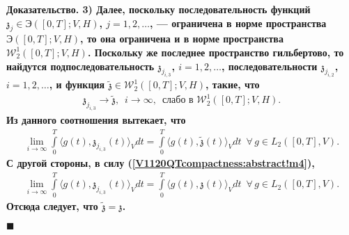 \documentclass{report}
\newenvironment{Proof}{\par\noindent\bf Доказательство.\rm}{ $\blacksquare$\par}
\begin{document}
\begin{Proof}
3) Далее, поскольку последовательность  функций $\mathfrak{z}_j\in \textrm{Э}([0,T];V,H)$, $j=1,2,\dots$, --- ограничена в норме пространства $\textrm{Э}([0,T];V,H)$, то она ограничена и в
норме пространства $\mathcal{W}^1_2([0,T];V,H)$. Поскольку же последнее пространство гильбертово, то найдутся подпоследовательность $\mathfrak{z}_{j_{i,3}}$, $i=1,2,\dots$,
последовательности $\mathfrak{z}_{j_{i,2}}$, $i=1,2,\dots$, и функция $\tilde{\mathfrak{z}}\in\mathcal{W}^1_2([0,T];V,H)$, такие, что
\begin{gather}\label{V1120QTcompactness:abstract!m7}
\mathfrak{z}_{j_{i,3}}\to\tilde{\mathfrak{z}},\,\,\,i\to\infty,\,\,\,\mbox{слабо в $\mathcal{W}^1_2([0,T];V,H)$}.
\end{gather}
Из данного соотношения вытекает, что
\begin{gather*}
\lim\limits_{i\to\infty}\int\limits_0^T\langle g(t),\mathfrak{z}_{j_{i,3}}(t)\rangle_Vdt=\int\limits_0^T\langle g(t),
\tilde{\mathfrak{z}}(t)\rangle_Vdt\,\,\,\forall\,g\in L_2([0,T],V).
\end{gather*}
С другой стороны, в силу (\ref{V1120QTcompactness:abstract!m4}),
\begin{gather*}
\lim\limits_{i\to\infty}\int\limits_0^T\langle g(t),\mathfrak{z}_{j_{i,3}}(t)\rangle_Vdt=\int\limits_0^T\langle g(t),\mathfrak{z}(t)\rangle_Vdt\,\,\,\forall\,g\in L_2([0,T],V).
\end{gather*}
Отсюда следует, что $\tilde{\mathfrak{z}}=\mathfrak{z}$.


\end{Proof}
\end{document}
